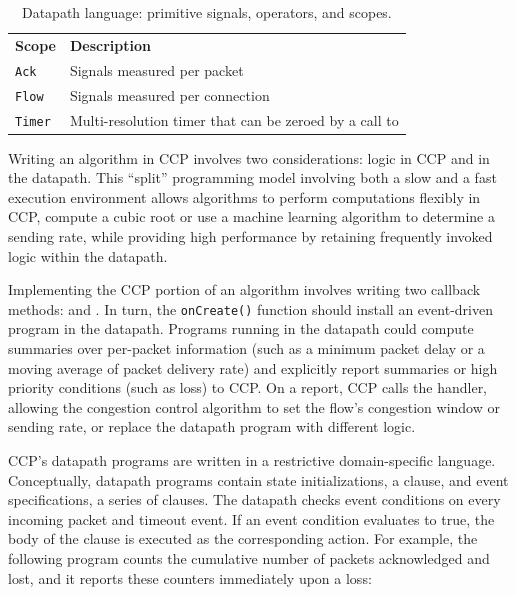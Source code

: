\begin{table}
\begin{tabular}{p{}p{}}
        \hline
        \hline
        \textbf{Scope} & \textbf{Description} \\
        \texttt{Ack} & Signals measured per packet \\
        \texttt{Flow} & Signals measured per connection \\
        \texttt{Timer} & Multi-resolution timer that can be zeroed by a call to \ct{reset} \\
    \end{tabular}
    \caption{Datapath language: primitive signals, operators, and scopes.}\label{tab:api}
\end{table}

Writing an algorithm in CCP involves two considerations: logic in CCP and in the datapath.
This ``split'' programming model involving both a slow and a fast execution environment allows
algorithms to perform computations flexibly in CCP, \eg compute a cubic
root or use a machine learning algorithm to determine a sending rate, while
providing high performance by retaining frequently invoked logic within
the datapath.

Implementing the CCP portion of an algorithm involves writing two callback methods:
 and .
In turn, the \texttt{onCreate()} function should install an
event-driven program in the datapath.
Programs running in the datapath could compute summaries over per-packet
information (such as a minimum packet delay or a moving average of packet
delivery rate) and explicitly report summaries or high priority conditions
(such as loss) to CCP.
On a report, CCP calls the  handler,
allowing the congestion control algorithm to set the flow's congestion
window or sending rate, or replace the datapath program with different logic.

 CCP's datapath programs are written in a restrictive
domain-specific language.
Conceptually, datapath programs contain state initializations, \ie a 
clause, and event specifications, \ie a series of  clauses.
The datapath checks event conditions on every incoming packet and timeout event.
If an event condition evaluates to true, the body of the  clause is executed as the corresponding
action.
For example, the following program counts the cumulative
number of packets acknowledged and lost, and it reports these counters immediately upon a loss:

